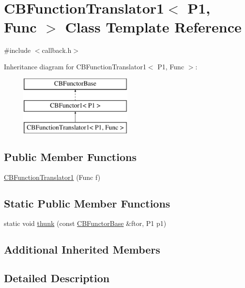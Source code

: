\hypertarget{class_c_b_function_translator1}{\section{C\+B\+Function\+Translator1$<$ P1, Func $>$ Class Template Reference}
\label{class_c_b_function_translator1}
}


{\ttfamily \#include $<$callback.\+h$>$}

Inheritance diagram for C\+B\+Function\+Translator1$<$ P1, Func $>$\+:\begin{figure}[H]
\begin{center}
\leavevmode
\includegraphics[height=3.000000cm]{class_c_b_function_translator1}
\end{center}
\end{figure}
\subsection*{Public Member Functions}
\begin{DoxyCompactItemize}
\item 
\hyperlink{class_c_b_function_translator1_ac72c06da799c65a37195218a5c800e12}{C\+B\+Function\+Translator1} (Func f)
\end{DoxyCompactItemize}
\subsection*{Static Public Member Functions}
\begin{DoxyCompactItemize}
\item 
static void \hyperlink{class_c_b_function_translator1_a7d85f4a12350666a798e1895afd5740c}{thunk} (const \hyperlink{class_c_b_functor_base}{C\+B\+Functor\+Base} \&ftor, P1 p1)
\end{DoxyCompactItemize}
\subsection*{Additional Inherited Members}


\subsection{Detailed Description}

